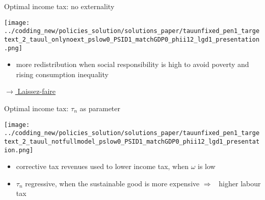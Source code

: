\documentclass[11pt,aspectratio=169]{beamer}
\newcommand{\ar}{$\Rightarrow$ \ }
\begin{document}
	\begin{frame}{Optimal income tax: no externality}
		\hypertarget{backLF}{}
		\begin{center}
			\begin{minipage}[]{0.45\textwidth}
				\texttt{[image: ../codding\_new/policies\_solution/solutions\_paper/tauunfixed\_pen1\_targetext\_2\_tauul\_onlynoext\_pslow0\_PSID1\_matchGDP0\_phii12\_lgd1\_presentation.png]}
			\end{minipage}	
		\end{center}
		\vspace{3mm}
		\begin{itemize}
			\item more redistribution when social responsibility is high to avoid poverty and rising consumption inequality
		\end{itemize}
		\vspace{-1mm}
		\hfill
		\hyperlink{LF}{\tiny{$\rightarrow$ Laissez-faire}}
	\end{frame}
	
	
	\addtocounter{framenumber}{-1}
	\begin{frame}{Optimal income tax: $\tau_n$ as parameter}
		\begin{center}
			\begin{minipage}[]{0.45\textwidth}
				\texttt{[image: ../codding\_new/policies\_solution/solutions\_paper/tauunfixed\_pen1\_targetext\_2\_tauul\_notfullmodel\_pslow0\_PSID1\_matchGDP0\_phii12\_lgd1\_presentation.png]}
			\end{minipage}
		\end{center}
		\vspace{3mm}
		\begin{itemize}
			\item corrective tax revenues used to lower income tax, when $\omega$ is low 
			\vspace{2mm}
			\item $\tau_n$ regressive, when the sustainable good is more expensive \ar higher labour tax
		\end{itemize}
	\end{frame}
	
\end{document}
